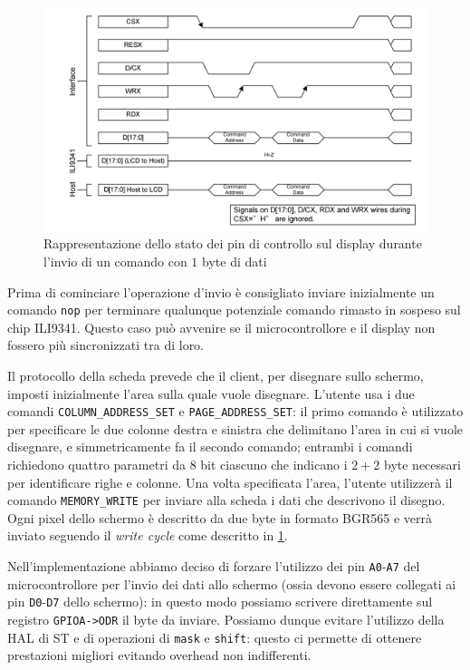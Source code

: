 \documentclass[hidelinks,12pt]{article}
\begin{document}
\begin{figure}[h]
	\centering
	\includegraphics[scale=0.8]{figures/wr_cycle.png}
	\caption{
		Rappresentazione dello stato dei pin di controllo sul display durante
		l'invio di un comando con $1$ byte di dati
	}
	\label{fig:ili_wr_cycle}
\end{figure}

Prima di cominciare l'operazione d'invio è consigliato inviare inizialmente
un comando \texttt{nop} per terminare qualunque potenziale comando rimasto in
sospeso sul chip ILI9341. Questo caso può avvenire se il microcontrollore e
il display non fossero più sincronizzati tra di loro.

Il protocollo della scheda prevede che il client, per disegnare sullo schermo,
imposti inizialmente l'area sulla quale vuole disegnare.
L'utente usa i due comandi \texttt{COLUMN\_ADDRESS\_SET} e
\texttt{PAGE\_ADDRESS\_SET}: il primo comando è utilizzato per specificare le
due colonne destra e sinistra che delimitano l'area in cui si vuole disegnare, e
simmetricamente fa il secondo comando; entrambi i comandi richiedono quattro
parametri da $8$ bit ciascuno che indicano i $2+2$ byte necessari per
identificare righe e colonne.
Una volta specificata l'area, l'utente utilizzerà il comando
\texttt{MEMORY\_WRITE} per inviare alla scheda i dati che descrivono il disegno.
Ogni pixel dello schermo è descritto da due byte in formato BGR565 e verrà
inviato seguendo il \textit{write cycle} come descritto in
\cref{fig:ili_wr_cycle}.

Nell'implementazione abbiamo deciso di forzare l'utilizzo dei pin
\texttt{A0}-\texttt{A7} del microcontrollore per l'invio dei dati allo schermo
(ossia devono essere collegati ai pin \texttt{D0}-\texttt{D7} dello schermo): in
questo modo possiamo scrivere direttamente sul registro \texttt{GPIOA->ODR} il
byte da inviare. Possiamo dunque evitare l'utilizzo della HAL di ST e di
operazioni di \texttt{mask} e \texttt{shift}: questo ci permette di ottenere
prestazioni migliori evitando overhead non indifferenti.
\end{document}
